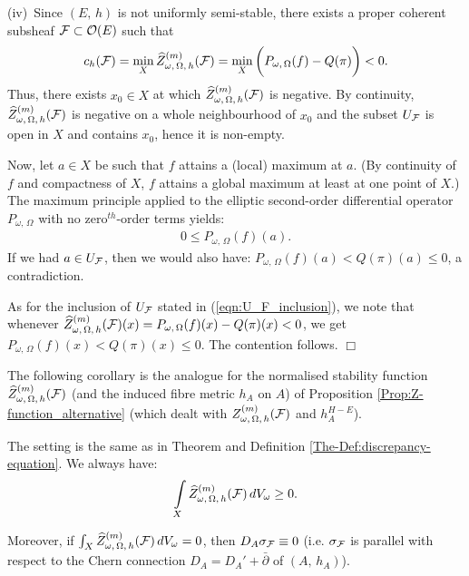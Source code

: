 \documentclass[12pt]{article}
\begin{document}
\vspace{1ex}

(iv)\, Since $(E,\,h)$ is not uniformly semi-stable, there exists a proper coherent subsheaf ${\cal F}\subset{\cal O}(E)$ such that \begin{eqnarray*}c_h({\cal F})=\min\limits_X\widehat{Z}_{\omega,\,\Omega,\,h}^{(m)}({\cal F}) = \min\limits_X\bigg(P_{\omega,\,\Omega}(f) - Q(\pi)\bigg) <0.\end{eqnarray*} Thus, there exists $x_0\in X$ at which $\widehat{Z}_{\omega,\,\Omega,\,h}^{(m)}({\cal F})$ is negative. By continuity, $\widehat{Z}_{\omega,\,\Omega,\,h}^{(m)}({\cal F})$ is negative on a whole neighbourhood of $x_0$ and the subset $U_{\cal F}$ is open  in $X$ and contains $x_0$, hence it is non-empty.

Now, let $a\in X$ be such that $f$ attains a (local) maximum at $a$. (By continuity of $f$ and compactness of $X$, $f$ attains a global maximum at least at one point of $X$.) The maximum principle applied to the elliptic second-order differential operator $P_{\omega,\,\Omega}$ with no zero$^{th}$-order terms yields: \begin{eqnarray*}0\leq P_{\omega,\,\Omega}(f)(a).\end{eqnarray*} If we had $a\in U_{\cal F}$, then we would also have: $P_{\omega,\,\Omega}(f)(a)<Q(\pi)(a)\leq 0$, a contradiction.

As for the inclusion of $U_{\cal F}$ stated in (\ref{eqn:U_F_inclusion}), we note that whenever $\widehat{Z}_{\omega,\,\Omega,\,h}^{(m)}({\cal F})(x) = P_{\omega,\,\Omega}(f)(x) - Q(\pi)(x)< 0$, we get $P_{\omega,\,\Omega}(f)(x) < Q(\pi)(x)\leq 0$. The contention follows. \hfill $\Box$




\vspace{2ex}

The following corollary is the analogue for the normalised stability function $\widehat{Z}_{\omega,\,\Omega,\,h}^{(m)}({\cal F})$ (and the induced fibre metric $h_A$ on $A$) of Proposition \ref{Prop:Z-function_alternative} (which dealt with $Z_{\omega,\,\Omega,\,h}^{(m)}({\cal F})$ and $h_A^{H-E}$).


\begin{Cor}\label{Cor:discrepancy-equation_Z-hat} The setting is the same as in Theorem and Definition \ref{The-Def:discrepancy-equation}. We always have: \begin{eqnarray}\label{eqn:Z-hat-function_integral}\int\limits_X \widehat{Z}_{\omega,\,\Omega,\,h}^{(m)}({\cal F})\,dV_\omega \geq 0.\end{eqnarray}

   Moreover, if $\int_X\widehat{Z}_{\omega,\,\Omega,\,h}^{(m)}({\cal F})\,dV_\omega = 0$, then $D_A\sigma_{{\cal F}}\equiv 0$ (i.e. $\sigma_{{\cal F}}$ is parallel with respect to the Chern connection $D_A = D_A' + \bar\partial$ of $(A,\,h_A)$).


\end{Cor}
\end{document}
